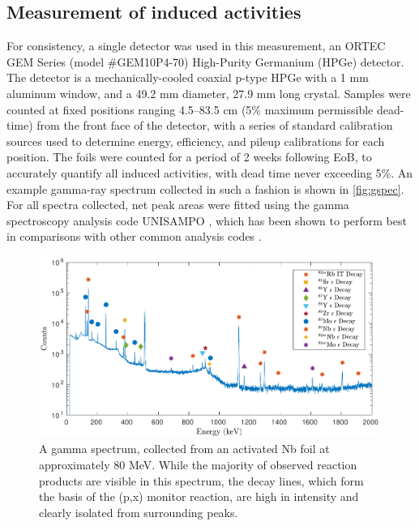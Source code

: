 \documentclass[3p]{elsarticle}
\begin{document}
\subsection{Measurement of induced activities}\label{sec:spectroscopy}


For consistency, a single detector was used in this measurement, an ORTEC GEM Series (model \#GEM10P4-70)  High-Purity Germanium (HPGe) detector.
The detector is a mechanically-cooled coaxial p-type HPGe with a 1 mm aluminum window, and a 49.2 mm diameter, 27.9 mm long crystal.
Samples were counted at fixed positions ranging 4.5--83.5  cm (5\% maximum permissible dead-time) from the front face of the detector, with a series of standard calibration sources used to determine energy, efficiency, and pileup calibrations for each position.
The foils were counted  for a period of 2 weeks following EoB, to accurately quantify all induced activities,  with dead time never exceeding 5\%.
An example gamma-ray spectrum collected in such a fashion is shown in \autoref{fig:gspec}.
For all spectra collected, net peak areas were fitted using the gamma spectroscopy analysis code UNISAMPO \cite{Aarnio2001}, which has been shown to perform best in comparisons with other common analysis codes \cite{Jackman2014}.

\begin{figure}
 \centering
 \includegraphics[width=6in]{./figures/sample_gspec.pdf}
 \caption{A gamma spectrum, collected from an activated Nb foil at approximately 80 MeV. While the majority of observed reaction products are visible in this spectrum,  the  decay lines, which form the basis of the (p,x) monitor reaction, are high in intensity and clearly isolated from surrounding peaks.}
 \label{fig:gspec}
\end{figure}
\end{document}
